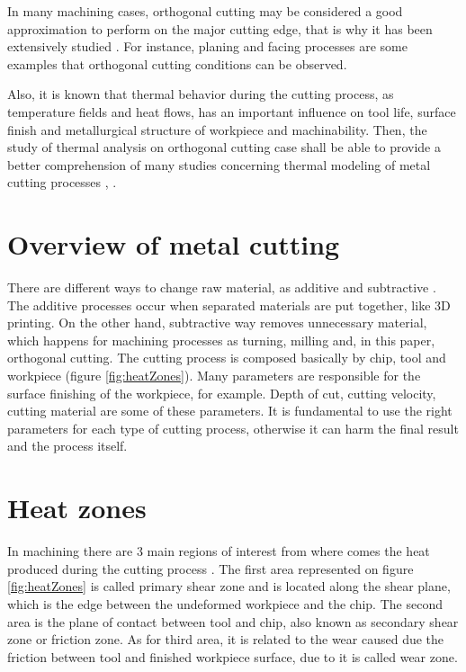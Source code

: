 	In many machining cases, orthogonal cutting may be considered a good approximation to perform on the major cutting edge, that is why it has been extensively studied \cite{shaw2005metal}. For instance, planing and facing processes are some examples that orthogonal cutting conditions can be observed.

	Also, it is known that thermal behavior during the cutting process, as temperature fields and heat flows, has an important influence on tool life, surface finish and metallurgical structure of workpiece and machinability. Then, the study of thermal analysis on orthogonal cutting case shall be able to provide a better comprehension of many studies concerning thermal modeling of metal cutting processes \cite{komanduri2000thermal}, \cite{komanduri2001thermal}.
	
	\section{Overview of metal cutting}
	
	There are different ways to change raw material, as additive and subtractive \cite{shaw2005metal}. The additive processes occur when separated materials are put together, like 3D printing. On the other hand, subtractive way removes unnecessary material, which happens for machining processes as turning, milling and, in this paper, orthogonal cutting. The cutting process is composed basically by chip, tool and workpiece (figure \ref{fig:heatZones}).
	Many parameters are responsible for the surface finishing of the workpiece, for example. Depth of cut, cutting velocity, cutting material are some of these parameters. It is fundamental to use the right parameters for each type of cutting process, otherwise it can harm the final result and the process itself.

	\section{Heat zones}

	In machining there are 3 main regions of interest from where comes the heat produced during the cutting process \cite{shaw2005metal}. The first area represented on figure \ref{fig:heatZones} is called primary shear zone and is located along the shear plane, which is the edge between the undeformed workpiece and the chip. The second area is the plane of contact between tool and chip, also known as secondary shear zone or friction zone. As for third area, it is related to the wear caused due the friction between tool and finished workpiece surface, due to it is called wear zone.

